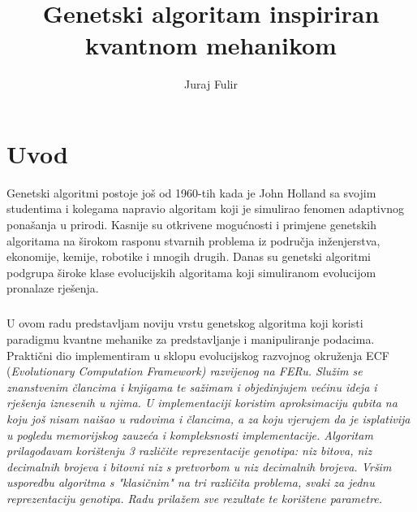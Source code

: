 \documentclass[times, utf8, zavrsni, numeric]{fer}
\begin{document}
\title{Genetski algoritam inspiriran kvantnom mehanikom}
\author{Juraj Fulir}

\maketitle

\izvornik


\tableofcontents

\chapter{Uvod}
Genetski algoritmi postoje još od 1960-tih kada je John Holland sa svojim studentima i kolegama napravio algoritam koji je simulirao fenomen adaptivnog ponašanja u prirodi. Kasnije su otkrivene mogućnosti i primjene genetskih algoritama na širokom rasponu stvarnih problema iz područja inženjerstva, ekonomije, kemije, robotike i mnogih drugih. Danas su genetski algoritmi podgrupa široke klase evolucijskih algoritama koji simuliranom evolucijom pronalaze rješenja. \citep{c_history}

\paragraph{}
U ovom radu predstavljam noviju vrstu genetskog algoritma koji koristi paradigmu kvantne mehanike za predstavljanje i manipuliranje podacima. Praktični dio implementiram u sklopu evolucijskog razvojnog okruženja ECF (\it Evolutionary Computation Framework\rm) razvijenog na FERu. Služim se znanstvenim člancima i knjigama te sažimam i objedinjujem većinu ideja i rješenja iznesenih u njima. U implementaciji koristim aproksimaciju qubita na koju još nisam naišao u radovima i člancima, a za koju vjerujem da je isplativija u pogledu memorijskog zauzeća i kompleksnosti implementacije. Algoritam prilagođavam korištenju 3 različite reprezentacije genotipa: niz bitova, niz decimalnih brojeva i bitovni niz s pretvorbom u niz decimalnih brojeva. Vršim usporedbu algoritma s "klasičnim" na tri različita problema, svaki za jednu reprezentaciju genotipa. Radu prilažem sve rezultate te korištene parametre. 
\end{document}
